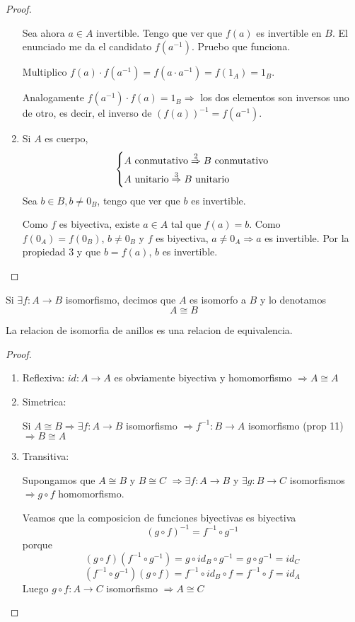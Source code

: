 \begin{proof}
\begin{enumerate}
		      Sea ahora \(a \in A \) invertible. Tengo que ver que \(f(a)\) es invertible en \(B \). El enunciado me da el candidato \(f(a^{-1} )\). Pruebo que funciona.
		      
		      Multiplico \(f(a) \cdot f(a^{-1} ) = f(a \cdot a^{-1} ) = f(1_A) = 1_B \).
		      
		      Analogamente \(f(a^{-1} ) \cdot f(a) = 1_B \Rightarrow \) los dos elementos son inversos uno de otro, es decir, el inverso de \((f(a))^{-1} = f(a^{-1})\).
		\item Si \(A \) es cuerpo,
		      \[
			      \begin{dcases}
				      A \text{ conmutativo} \overset{2}{\Rightarrow} B \text{ conmutativo} \\
				      A \text{ unitario} \overset{3}{\Rightarrow} B \text{ unitario}
			      \end{dcases}
		      \]
		      Sea \(b \in B, b \neq 0_B\), tengo que ver que \(b \) es invertible.
		      
		      Como \(f \) es biyectiva, existe \(a \in A \) tal que \(f(a) = b \). Como \(f(0_A) = f(0_B )\), \(b \neq 0_B \) y \(f \) es biyectiva, \(a \neq 0_A \Rightarrow a \) es invertible. Por la propiedad 3 y que \(b = f(a) \), \(b \) es invertible.
	\end{enumerate}
\end{proof}
\begin{remark}
	Si \(\exists  f \colon A \to B \) isomorfismo, decimos que \(A \) es isomorfo a \(B \) y lo denotamos
	\[
		A \cong B
	\]
\end{remark}
\begin{proposition}
	La relacion de isomorfia de anillos es una relacion de equivalencia.
\end{proposition}
\begin{proof}
	\begin{enumerate}
		\item Reflexiva: \(id \colon A \to A \) es obviamente biyectiva y homomorfismo \(\Rightarrow A \cong A \)
		\item Simetrica:
		      
		      Si \(A \cong B \Rightarrow \exists f \colon A \to B\) isomorfismo \(\Rightarrow f^{-1} \colon B \to A \) isomorfismo (prop 11) \(\Rightarrow B \cong A\)
		      
		\item Transitiva:
		      
		      Supongamos que \(A \cong B \) y \(B \cong C \) \(\Rightarrow \exists f \colon A \to B \) y \(\exists g \colon B \to C \) isomorfismos \(\Rightarrow g \circ f \) homomorfismo.
		      
		      Veamos que la composicion de funciones biyectivas es biyectiva
		      \[
			      (g \circ f)^{-1} = f^{-1} \circ g^{-1}
		      \] porque
		      \[
			      (g \circ f)(f^{-1} \circ g^{-1} ) = g \circ id_B \circ g^{-1} = g \circ g^{-1} = id_C
		      \]
		      \[
			      (f^{-1} \circ g^{-1} ) (g \circ f) = f^{-1} \circ id_B \circ f = f^{-1} \circ f = id_A
		      \]
		      Luego \(g \circ f \colon A \to C \) isomorfismo \(\Rightarrow A \cong C \)
	\end{enumerate}
\end{proof}


